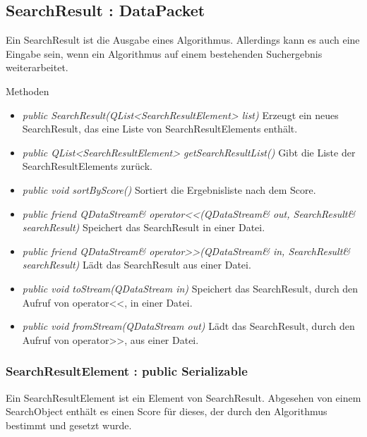 \subsection*{SearchResult : DataPacket}
Ein SearchResult ist die Ausgabe eines Algorithmus. Allerdings kann es auch eine Eingabe sein, wenn ein Algorithmus auf einem bestehenden Suchergebnis weiterarbeitet.

Methoden
\begin{itemize}
\item \textit{public SearchResult(QList<SearchResultElement> list)} Erzeugt ein neues SearchResult, das eine Liste von SearchResultElements enthält.
\item \textit{public QList<SearchResultElement> getSearchResultList()} Gibt die Liste der SearchResultElements zurück.
\item \textit{public void sortByScore()} Sortiert die Ergebnisliste nach dem Score.
\item \textit{public friend QDataStream\& operator<<(QDataStream\& out, SearchResult\& searchResult)} Speichert das SearchResult in einer Datei.
\item \textit{public friend QDataStream\& operator>>(QDataStream\& in, SearchResult\& searchResult)} Lädt das SearchResult aus einer Datei.
\item \textit{public void toStream(QDataStream in)} Speichert das SearchResult, durch den Aufruf von operator<<, in einer Datei.
\item \textit{public void fromStream(QDataStream out)} Lädt das SearchResult, durch den Aufruf von operator>>, aus einer Datei.
\end{itemize}

\subsubsection*{SearchResultElement : public Serializable}
Ein SearchResultElement ist ein Element von SearchResult. Abgesehen von einem SearchObject enthält es einen Score für dieses, der durch den Algorithmus bestimmt und gesetzt wurde.

